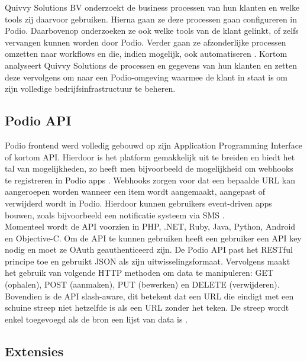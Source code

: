 Quivvy Solutions BV onderzoekt de business processen van hun klanten en welke tools zij daarvoor gebruiken. Hierna gaan ze deze processen gaan configureren in Podio. Daarbovenop onderzoeken ze ook welke tools van de klant gelinkt, of zelfs vervangen kunnen worden door Podio. Verder gaan ze afzonderlijke processen omzetten naar workflows en die, indien mogelijk, ook automatiseren \autocite{QuivvySoftware}. Kortom analyseert Quivvy Solutions de processen en gegevens van hun klanten en zetten deze vervolgens om naar een Podio-omgeving waarmee de klant in staat is om zijn volledige bedrijfsinfrastructuur te beheren. \\

\subsection{Podio API}


Podio frontend werd volledig gebouwd op zijn Application Programming Interface of kortom API. Hierdoor is het platform gemakkelijk uit te breiden en biedt het tal van mogelijkheden, zo heeft men bijvoorbeeld de mogelijkheid om webhooks te registreren in Podio apps \autocite{PodioAPI2023}. Webhooks zorgen voor dat een bepaalde URL kan aangeroepen worden wanneer een item wordt aangemaakt, aangepast of verwijderd wordt in Podio. Hierdoor kunnen gebruikers event-driven apps bouwen, zoals bijvoorbeeld een notificatie systeem via SMS \autocite{PodioAPIWebhooks}. \\

Momenteel wordt de API voorzien in PHP, .NET, Ruby, Java, Python, Android en Objective-C. Om de API te kunnen gebruiken heeft een gebruiker een API key nodig en moet ze OAuth geauthenticeerd zijn. De Podio API past het RESTful principe toe en gebruikt JSON als zijn uitwisselingsformaat. Vervolgens maakt het gebruik van volgende HTTP methoden om data te manipuleren: GET (ophalen), POST (aanmaken), PUT (bewerken) en DELETE (verwijderen). Bovendien is de API slash-aware, dit betekent dat een URL die eindigt met een schuine streep niet hetzelfde is als een URL zonder het teken. De streep wordt enkel toegevoegd als de bron een lijst van data is \autocite{PodioAPIConcepts}. \\


\subsection{Extensies}

